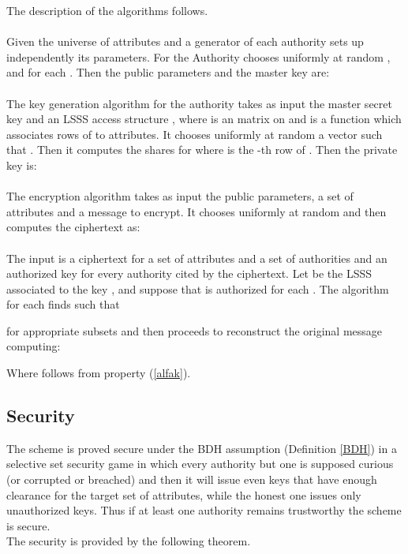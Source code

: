   The description of the algorithms follows.

  \paragraph*{}
    Given the universe of attributes  and a generator  of  each authority sets up independently its parameters.
    For  the Authority  chooses uniformly at random , and  for each .
    Then the public parameters  and the master key  are:
    

  \paragraph*{}
    The key generation algorithm for the authority  takes as input the master secret key  and an LSSS access structure , where  is an  matrix on  and  is a function which associates rows of  to attributes.
    It chooses uniformly at random a vector  such that .
    Then it computes the shares  for  where  is the -th row of .
    Then the private key  is:
    

  \paragraph*{}
    The encryption algorithm takes as input the public parameters, a set  of attributes and a message  to encrypt.
    It chooses  uniformly at random and then computes the ciphertext as:
    

  \paragraph*{}
    The input is a ciphertext for a set of attributes  and a set of authorities  and an authorized key for every authority cited by the ciphertext.
    Let  be the LSSS associated to the key , and suppose that  is authorized for each .
    The algorithm for each  finds  such that
    
    for appropriate subsets  and then proceeds to reconstruct the original message computing:
    
    Where  follows from property (\ref{alfak}).

\subsection{Security}
  The scheme is proved secure under the BDH assumption (Definition \ref{BDH}) in a selective set security game in which every authority but one is supposed curious (or corrupted or breached) and then it will issue even keys that have enough clearance for the target set of attributes, while the honest one issues only unauthorized keys.
  Thus if at least one authority remains trustworthy the scheme is secure.\\
  The security  is provided by the following theorem.

